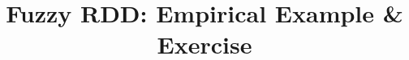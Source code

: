 \documentclass[hyperref={pdfpagelabels=false}]{beamer}
\begin{document}


\title[]
{Fuzzy RDD: Empirical Example \& Exercise}

\author
{}

\institute{}

\date
{}

\begin{frame}{}
	\titlepage
\end{frame}
\end{document}
